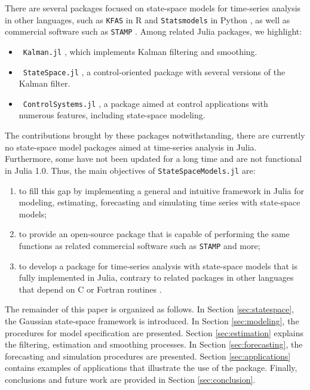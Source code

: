 \documentclass{juliacon}
\begin{document}
There are several packages focused on state-space models for time-series analysis in other languages, such as \texttt{KFAS} in R \cite{kfas} and \texttt{Statsmodels} in Python \cite{seabold2010statsmodels}, as well as commercial software such as \texttt{STAMP} \cite{koopman2000stamp}. Among related Julia packages, we highlight:
\begin{itemize}
    \item ~\texttt{Kalman.jl} \cite{kalmanjl}, which implements Kalman filtering and smoothing.
    \item ~\texttt{StateSpace.jl} \cite{statespacejl}, a control-oriented package with several versions of the Kalman filter.
    \item ~\texttt{ControlSystems.jl} \cite{controlsystemsjl}, a package aimed at control applications with numerous features, including state-space modeling.
\end{itemize}

The contributions brought by these packages notwithstanding, there are currently no state-space model packages aimed at time-series analysis in Julia. Furthermore, some have not been updated for a long time and are not functional in Julia 1.0. Thus, the main objectives of \texttt{StateSpaceModels.jl} \cite{statespacemodels} are:

\begin{enumerate}
    \item to fill this gap by implementing a general and intuitive framework in Julia for modeling, estimating, forecasting and simulating time series with state-space models;
    \item to provide an open-source package that is capable of performing the same functions as related commercial software such as \texttt{STAMP} and more;
    \item to develop a package for time-series analysis with state-space models that is fully implemented in Julia, contrary to related packages in other languages that depend on C or Fortran \mbox{routines} \cite{kfas}.
\end{enumerate}

The remainder of this paper is organized as follows. In Section \ref{sec:statespace}, the Gaussian state-space framework is introduced. In Section \ref{sec:modeling}, the procedures for model specification are presented. Section \ref{sec:estimation} explains the filtering, estimation and smoothing processes. In Section \ref{sec:forecasting}, the forecasting and simulation procedures are presented. Section \ref{sec:applications} contains examples of applications that illustrate the use of the package. Finally, conclusions and future work are provided in Section \ref{sec:conclusion}.
\end{document}
